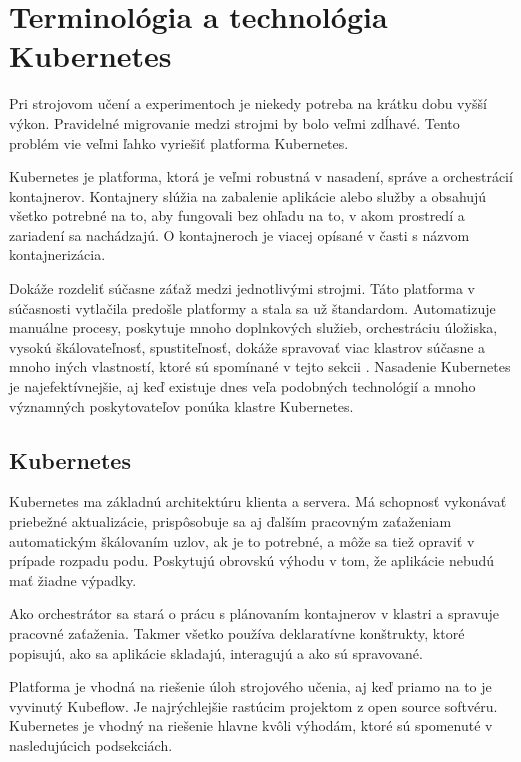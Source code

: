 
\chapter[Terminológia a technológia Kubernetes]{Terminológia a technológia\\ Kubernetes}

Pri strojovom učení a experimentoch je niekedy potreba na krátku dobu vyšší výkon. Pravidelné migrovanie medzi strojmi by bolo veľmi zdĺhavé. Tento problém vie veľmi ľahko vyriešiť platforma Kubernetes.

Kubernetes je platforma, ktorá je veľmi robustná v nasadení, správe a orchestrácií kontajnerov. Kontajnery slúžia na zabalenie aplikácie alebo služby a obsahujú všetko potrebné na to, aby fungovali bez ohľadu na to, v akom prostredí a zariadení sa nachádzajú. O kontajneroch je viacej opísané v časti s názvom kontajnerizácia.

Dokáže rozdeliť súčasne záťaž medzi jednotlivými strojmi. Táto platforma v súčasnosti vytlačila predošle platformy a stala sa už štandardom. Automatizuje manuálne procesy, poskytuje mnoho doplnkových služieb, orchestráciu úložiska, vysokú škálovateľnosť, spustiteľnosť, dokáže spravovať viac klastrov súčasne a mnoho iných vlastností, ktoré sú spomínané v tejto sekcii \cite{vlastnostikub}. Nasadenie Kubernetes je najefektívnejšie, aj keď existuje dnes veľa podobných technológií a mnoho významných poskytovateľov ponúka klastre Kubernetes.

\section{Kubernetes}
Kubernetes ma základnú architektúru klienta a servera. Má schopnosť vykonávať priebežné aktualizácie, prispôsobuje sa aj ďalším pracovným zaťaženiam automatickým škálovaním uzlov, ak je to potrebné, a môže sa tiež opraviť v prípade rozpadu podu. Poskytujú obrovskú výhodu v tom, že aplikácie nebudú mať žiadne výpadky.

Ako orchestrátor sa stará o prácu s plánovaním kontajnerov v klastri a spravuje pracovné zaťaženia. Takmer všetko používa deklaratívne konštrukty, ktoré popisujú, ako sa aplikácie skladajú, interagujú a ako sú spravované.

Platforma je vhodná na riešenie úloh strojového učenia, aj keď priamo na to je vyvinutý Kubeflow. Je najrýchlejšie rastúcim projektom z open source softvéru. Kubernetes je vhodný na riešenie hlavne kvôli výhodám, ktoré sú spomenuté v nasledujúcich podsekciách.


